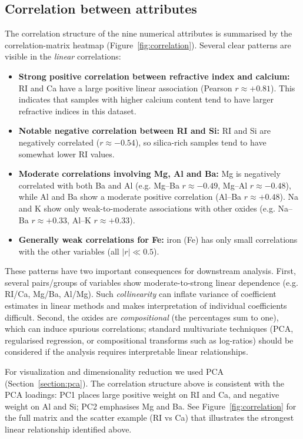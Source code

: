 \documentclass[dtu]{dtuarticle}
\begin{document}
	\subsection{Correlation between attributes}

	\label{section:correlation}

	The correlation structure of the nine numerical attributes is summarised by the correlation-matrix
	heatmap (Figure~\ref{fig:correlation}).  Several clear patterns are visible in the \textit{linear} correlations:

	\begin{itemize}
	  \item \textbf{Strong positive correlation between refractive index and calcium:} RI and Ca have a large
	    positive linear association (Pearson $r \approx +0.81$). This indicates that samples with higher
	    calcium content tend to have larger refractive indices in this dataset.
	  \item \textbf{Notable negative correlation between RI and Si:} RI and Si are negatively correlated
	    ($r \approx -0.54$), so silica-rich samples tend to have somewhat lower RI values.
	  \item \textbf{Moderate correlations involving Mg, Al and Ba:} Mg is negatively correlated with both Ba
	    and Al (e.g. Mg--Ba $r\approx -0.49$, Mg--Al $r\approx -0.48$), while Al and Ba show a moderate
	    positive correlation (Al--Ba $r\approx +0.48$). Na and K show only weak-to-moderate associations
	    with other oxides (e.g. Na--Ba $r\approx +0.33$, Al--K $r\approx +0.33$).
	  \item \textbf{Generally weak correlations for Fe:} iron (Fe) has only small correlations with the other
	    variables (all $|r| \ll 0.5$).
	\end{itemize}

	These patterns have two important consequences for downstream analysis. First, several pairs/groups of
	variables show moderate-to-strong linear dependence (e.g. RI/Ca, Mg/Ba, Al/Mg). Such \textit{collinearity} can
	inflate variance of coefficient estimates in linear methods and makes interpretation of individual
	coefficients difficult. Second, the oxides are \textit{compositional} (the percentages sum to one), which
	can induce spurious correlations; standard multivariate techniques (PCA, regularised regression, or
	compositional transforms such as log-ratios) should be considered if the analysis requires interpretable
	linear relationships.

	For visualization and dimensionality reduction we used PCA (Section~\ref{section:pca}). The correlation structure above
	is consistent with the PCA loadings: PC1 places large positive weight on RI and Ca, and negative weight
	on Al and Si; PC2 emphasises Mg and Ba.  See Figure~\ref{fig:correlation} for the full matrix and the
	scatter example (RI vs Ca) that illustrates the strongest linear relationship identified above.
\end{document}
